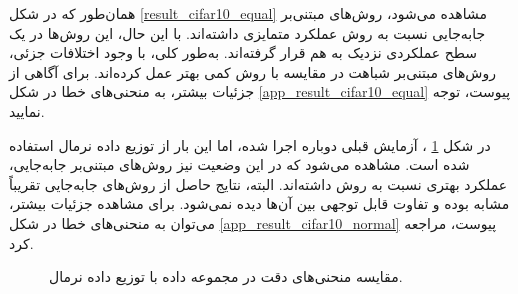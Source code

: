 همان‌طور که در شکل
\ref{result_cifar10_equal}
مشاهده می‌شود، روش‌های مبتنی‌بر جابه‌جایی نسبت به روش
عملکرد متمایزی داشته‌اند. با این حال، این روش‌ها در یک سطح عملکردی نزدیک به هم قرار گرفته‌اند. به‌طور کلی، با وجود اختلافات جزئی، روش‌های مبتنی‌بر شباهت در مقایسه با روش
کمی بهتر عمل کرده‌اند. برای آگاهی از جزئیات بیشتر، به منحنی‌های خطا در شکل
\ref{app_result_cifar10_equal}
پیوست، توجه نمایید.


در شکل
\ref{result_cifar10_normal}%
، آزمایش قبلی دوباره اجرا شده، اما این بار از توزیع داده نرمال استفاده شده است. مشاهده می‌شود که در این وضعیت نیز روش‌های مبتنی‌بر جابه‌جایی، عملکرد بهتری نسبت به روش
داشته‌اند. البته، نتایج حاصل از روش‌های جابه‌جایی تقریباً مشابه بوده و تفاوت قابل توجهی بین آن‌ها دیده نمی‌شود. برای مشاهده جزئیات بیشتر، می‌توان به منحنی‌های خطا در شکل
\ref{app_result_cifar10_normal}
پیوست، مراجعه کرد.

\begin{figure}[t!]
	\centering
	\hspace{0.8mm}
	\caption{
		مقایسه منحنی‌های دقت در مجموعه داده
		با توزیع داده نرمال.
	}
	\label{result_cifar10_normal}
\end{figure}




